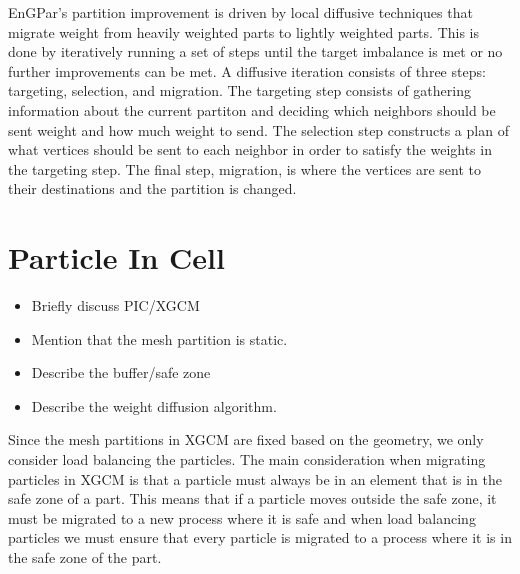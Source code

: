 \documentclass[conference]{IEEEtran}
\begin{document}

EnGPar's partition improvement is driven by local diffusive techniques that migrate weight
from heavily weighted parts to lightly weighted parts. This is done by iteratively running
a set of steps until the target imbalance is met or no further improvements can be met.
A diffusive iteration consists of three steps: targeting, selection, and migration.
The targeting step consists of gathering information about the current partiton and deciding
which neighbors should be sent weight and how much weight to send. The selection step constructs
a plan of what vertices should be sent to each neighbor in order to satisfy the weights in
the targeting step. The final step, migration, is where the vertices are sent to their
destinations and the partition is changed.

\section{Particle In Cell}

\begin{itemize}
\item Briefly discuss PIC/XGCM
\item Mention that the mesh partition is static.
\item Describe the buffer/safe zone
\item Describe the weight diffusion algorithm.
\end{itemize}

Since the mesh partitions in XGCM are fixed based on the geometry, we only consider
load balancing the particles. The main consideration when migrating particles in XGCM
is that a particle must always be in an element that is in the safe zone of a part.
This means that if a particle moves outside the safe zone, it must be migrated to a
new process where it is safe and when load balancing particles we must ensure that every
particle is migrated to a process where it is in the safe zone of the part.
\end{document}
